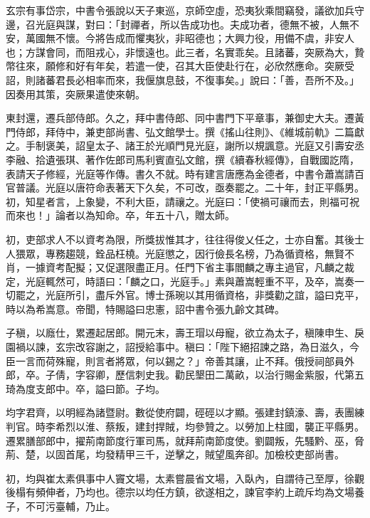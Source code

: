 \begin{pinyinscope}
 玄宗有事岱宗，中書令張說以天子東巡，京師空虛，恐夷狄乘間竊發，議欲加兵守邊，召光庭與謀，對曰：「封禪者，所以告成功也。夫成功者，德無不被，人無不安，萬國無不懷。今將告成而懼夷狄，非昭德也；大興力役，用備不虞，非安人也；方謀會同，而阻戎心，非懷遠也。此三者，名實乖矣。且諸蕃，突厥為大，贄幣往來，願修和好有年矣，若遣一使，召其大臣使赴行在，必欣然應命。突厥受詔，則諸蕃君長必相率而來，我偃旗息鼓，不復事矣。」說曰：「善，吾所不及。」因奏用其策，突厥果遣使來朝。



 東封還，遷兵部侍郎。久之，拜中書侍郎、同中書門下平章事，兼御史大夫。遷黃門侍郎，拜侍中，兼吏部尚書、弘文館學士。撰《搖山往則》、《維城前軌》二篇獻之。手制褒美，詔皇太子、諸王於光順門見光庭，謝所以規諷意。光庭又引壽安丞李融、拾遺張琪、著作佐郎司馬利賓直弘文館，撰《續春秋經傳》，自戰國訖隋，表請天子修經，光庭等作傳。書久不就。時有建言唐應為金德者，中書令蕭嵩請百官普議。光庭以唐符命表著天下久矣，不可改，亟奏罷之。二十年，封正平縣男。初，知星者言，上象變，不利大臣，請禳之。光庭曰：「使禍可禳而去，則福可祝而來也！」論者以為知命。卒，年五十八，贈太師。



 初，吏部求人不以資考為限，所獎拔惟其才，往往得俊乂任之，士亦自奮。其後士人猥眾，專務趨競，銓品枉橈。光庭懲之，因行儉長名榜，乃為循資格，無賢不肖，一據資考配擬；又促選限盡正月。任門下省主事閻麟之專主過官，凡麟之裁定，光庭輒然可，時語曰：「麟之口，光庭手。」素與蕭嵩輕重不平，及卒，嵩奏一切罷之，光庭所引，盡斥外官。博士孫琬以其用循資格，非獎勸之誼，謚曰克平，時以為希嵩意。帝聞，特賜謚曰忠憲，詔中書令張九齡文其碑。



 子稹，以廕仕，累遷起居郎。開元末，壽王瑁以母寵，欲立為太子，稹陳申生、戾園禍以諫，玄宗改容謝之，詔授給事中。稹曰：「陛下絕招諫之路，為日滋久，今臣一言而荷殊寵，則言者將眾，何以錫之？」帝善其讓，止不拜。俄授祠部員外郎，卒。子倩，字容卿，歷信刺史我。勸民墾田二萬畝，以治行賜金紫服，代第五琦為度支郎中。卒，謚曰節。子均。



 均字君齊，以明經為諸暨尉。數從使府闢，硜硜以才顯。張建封鎮濠、壽，表團練判官。時李希烈以淮、蔡叛，建封捍賊，均參贊之。以勞加上柱國，襲正平縣男。遷累膳部郎中，擢荊南節度行軍司馬，就拜荊南節度使。劉闢叛，先騷黔、巫，脅荊、楚，以固首尾，均發精甲三千，逆擊之，賊望風奔卻。加檢校吏部尚書。



 初，均與崔太素俱事中人竇文場，太素嘗晨省文場，入臥內，自謂待己至厚，徐觀後榻有頻伸者，乃均也。德宗以均任方鎮，欲遂相之，諫官李約上疏斥均為文場養子，不可污臺輔，乃止。




\end{pinyinscope}
